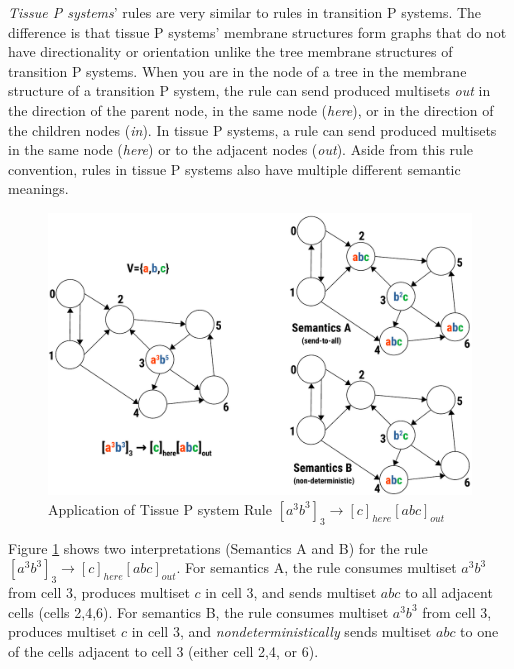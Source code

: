 \documentclass{article}
\begin{document}
\textit{Tissue P systems}' rules are very similar to rules in transition P systems. The difference 
is that tissue P systems' membrane structures form graphs that do not have directionality or
orientation unlike the tree membrane structures of transition P systems. When you are in the node
of a tree in the membrane structure of a transition P system, the rule can send produced multisets
\textit{out} in the direction of the parent node, in the same node (\textit{here}), or in the
direction of the children nodes (\textit{in}). In tissue P systems, a rule can send produced 
multisets in the same node (\textit{here}) or to the adjacent nodes (\textit{out}). Aside from this
rule convention, rules in tissue P systems also have multiple different semantic meanings.

\begin{figure}[H]
\begin{center}
\includegraphics[scale=0.55]{figures/zzz-tissue-rule.pdf}
\caption{Application of Tissue P system Rule $[a^3b^3]_3 \rightarrow [c]_{here}[abc]_{out}$}
\label{fig:tissue-rule}
\end{center}
\end{figure}

Figure \ref{fig:tissue-rule} shows two interpretations (Semantics A and B) for the rule 
$[a^3b^3]_3 \rightarrow [c]_{here}[abc]_{out}$. For semantics A, the rule consumes multiset 
$a^3b^3$ from cell 3, produces multiset $c$ in cell 3, and sends multiset $abc$ to all adjacent
cells (cells 2,4,6). For semantics B, the rule consumes multiset $a^3b^3$ from cell 3, produces
multiset $c$ in cell 3, and \textit{nondeterministically} sends multiset $abc$ to one of the
cells adjacent to cell 3 (either cell 2,4, or 6).
\end{document}
